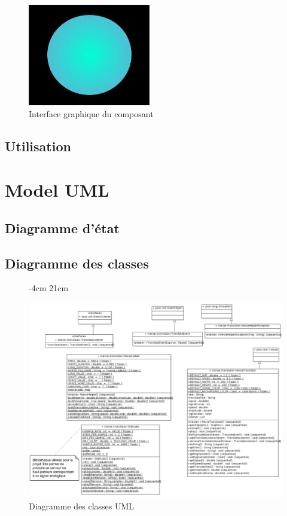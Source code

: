 \documentclass[a4paper,11pt]{article}
\begin{document}
	\begin{figure}[H]
		\begin{center}
			\includegraphics[scale=0.5]{comdescpicture.jpg}
			\caption{Interface graphique du composant}
			\label{Interface graphique du composant}
		\end{center}
	\end{figure}
    \subsection{Utilisation}
    

    \section{Model UML}
    \subsection{Diagramme d'état}
    \subsection{Diagramme des classes}
    \begin{figure}[H]
    	 -4cm 21cm
    	\begin{center}
    		\includegraphics[scale=0.55]{classdiag.png}
    		\caption{Diagramme des classes UML}
    		\label{Diagramme des classes UML}
    	\end{center}
    \end{figure}
\end{document}
